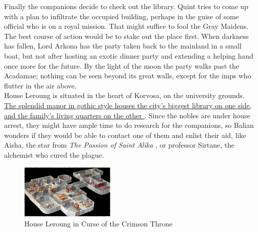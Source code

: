 Finally the companions decide to check out the library. Quint tries to come up with a plan to infiltrate the occupied building, perhaps in the guise of some official who is on a royal mission. That might suffice to fool the Gray Maidens. The best course of action would be to stake out the place first. When darkness has fallen, Lord Arkona has the party taken back to the mainland in a small boat, but not after hosting an exotic dinner party and extending a helping hand once more for the future. By the light of the moon the party walks past the Acadamae; nothing can be seen beyond its great walls, except for the imps who flutter in the air above.\\

House Leroung is situated in the heart of Korvosa, on the university grounds.\hyperref[fig:House-Leroung-in-Curse-of-the-Crimson-Throne-607543444]{ The splendid manor in gothic style houses the city's biggest library on one side, and the family's living quarters on the other } . Since the nobles are under house arrest, they might have ample time to do research for the companions, so Balian wonders if they would be able to contact one of them and enlist their aid, like Aisha, the star from  {\itshape The Passion of Saint Alika} , or professor Sirtane, the alchemist who cured the plague. \\

\begin{figure}[h]
	\centering
	\includegraphics[width=0.4\textwidth]{images/House-Leroung-in-Curse-of-the-Crimson-Throne-607543444_mod.jpg}
	\caption{House Leroung in Curse of the Crimson Throne}
	\label{fig:House-Leroung-in-Curse-of-the-Crimson-Throne-607543444}
\end{figure}


